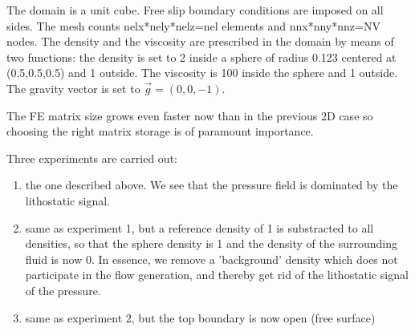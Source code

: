 The domain is a unit cube. Free slip boundary conditions 
are imposed on all sides. The mesh counts 
nelx*nely*nelz=nel elements and 
nnx*nny*nnz=NV nodes.
The density and the viscosity are prescribed in the domain 
by means of two functions:
the density is set to 2 inside a sphere of radius 0.123 centered 
at (0.5,0.5,0.5) and 1 outside. The viscosity is 100 inside the sphere
and 1 outside.  The gravity vector is set to $\vec{g}=(0,0,-1)$.

The FE matrix size grows even faster now than in the previous 2D case so
choosing the right matrix storage is of paramount importance. 

Three experiments are carried out:
\begin{enumerate}
\item the one described above.
We see that the pressure field is dominated by the lithostatic signal.
\item same as experiment 1, but a reference density of 1 is substracted to all densities, so that 
the sphere density is 1 and the density of the surrounding fluid is now 0. In essence, we remove a
'background' density which does not participate in the flow generation, and thereby get rid of the 
lithostatic signal of the pressure.
\item same as experiment 2, but the top boundary is now open (free surface)
\end{enumerate} 


